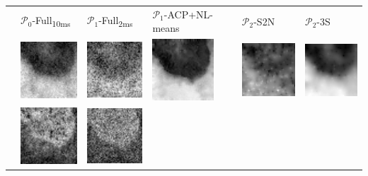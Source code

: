 \bgroup
\def\arraystretch{1.5}%
\begin{tabular}{M{0.02cm}*{5}{M{2.4cm}}}
%
&
$\mathcal{P}_0$-Full\textsubscript{10ms}&
$\mathcal{P}_1$-Full\textsubscript{2ms}&
$\mathcal{P}_1$-ACP+NL-means&
$\mathcal{P}_2$-S2N&
$\mathcal{P}_2$-3S\\
%
&
\includegraphics[width=2.3cm]{img/chapitre3/figure10/1-Full10ms_1.png}&
\includegraphics[width=2.3cm]{img/chapitre3/figure10/2-Full2ms_1.png}&
\includegraphics[width=2.3cm]{img/chapitre3/figure10/3-PCA+NLm_1.png}&
\includegraphics[width=2.3cm]{img/chapitre3/figure10/7-P2-S2N_1.png}&
\includegraphics[width=2.3cm]{img/chapitre3/figure10/8-P2-3S_1.png}\\
%
&
\includegraphics[width=2.3cm]{img/chapitre3/figure10/1-Full10ms_2.png}&
\includegraphics[width=2.3cm]{img/chapitre3/figure10/2-Full2ms_2.png}&

\end{tabular}
